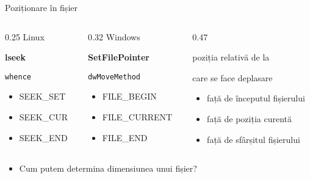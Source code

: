 \documentclass{so.cs.pub.ro}
\begin{document}
\begin{frame}{Poziționare în fișier}
 
      \begin{columns}
	\begin{column} [1]{0.25\textwidth}
	  \hspace*{0.8cm}Linux

	  \hspace*{0.8cm}\textbf{lseek} 

	  \hspace*{0.8cm}\texttt{whence}
	  \vspace*{0.4cm}
	  \begin{itemize}
	    \item SEEK_SET
	    \item SEEK_CUR
	    \item SEEK_END
	  \end{itemize}       
	\end{column}
	\begin{column}  [1]{0.32\textwidth}
	  \hspace*{0.8cm} Windows

	  \hspace*{0.8cm} \textbf{SetFilePointer}

	  \hspace*{0.8cm} \texttt{dwMoveMethod}
	  \vspace*{0.4cm}
	  \begin{itemize}
	    \item FILE_BEGIN
	    \item FILE_CURRENT
	    \item FILE_END
	  \end{itemize}
	\end{column}
	\begin{column} [1]{0.47\textwidth}
	  \newline

	  \hspace*{0.8cm}poziția relativă de la 
	  
	  \hspace*{0.8cm}care se face deplasare
	  \vspace*{0.2cm}
	  \begin{itemize}
	    \item față de începutul fișierului
	    \item față de poziția curentă
	    \item față de sfârșitul fișierului
	  \end{itemize}
	\end{column}
      \end{columns}
    \vspace*{0.5cm}
 \begin{itemize}  
   \item Cum putem determina dimensiunea unui fișier?
  \end{itemize}
\end{frame}
\end{document}
